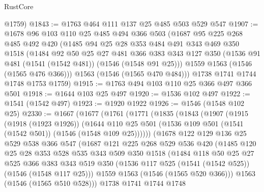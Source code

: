 \begin{lexlean}{RustCore}
\begin{coremodule}
      @1759)
@1843 := @1763 @464 @111 @137 @25 @485 @503 @529 @547
@1907 := @1678
    @96
    @103
    @110
    @25
    @485
    @494
    @366
    @503
    (@1687
      @95
      @225
      @268
      @485
      @492
      @420
      (@1485
        @94
        @25
        @28
        @353
        @484
        @491
        @343
        @469
        @350
        @1518
        (@1484
          @92
          @50
          @25
          @27
          @481
          @366
          @383
          @343
          @127
          @350
          (@1536 @91 @481 (@1541 (@1542 @481)) (@1546 (@1548 @91 @25)))
          @1559
          @1563
          (@1546 (@1565 @476 @366)))
        @1563
        (@1546 (@1565 @470 @484)))
      @1738
      @1741
      @1744
      @1748
      @1753
      @1759)
@1915 := @1763 @494 @103 @110 @25 @366 @497 @366 @501
@1918 := @1644 @103 @25 @497
@1920 := @1536 @102 @497
@1922 := @1541 (@1542 @497)
@1923 := @1920 @1922
@1926 := @1546 (@1548 @102 @25)
@2330 := @1667
    (@1677
      (@1761
        (@1771
          (@1835
            (@1843
              (@1907
                (@1915
                  (@1918 (@1923 @1926))
                  (@1644
                    @110
                    @25
                    @501
                    (@1536 @109 @501 (@1541 (@1542 @501)) (@1546 (@1548 @109 @25))))))
              (@1678
                @122
                @129
                @136
                @25
                @529
                @538
                @366
                @547
                (@1687
                  @121
                  @225
                  @268
                  @529
                  @536
                  @420
                  (@1485
                    @120
                    @25
                    @28
                    @353
                    @528
                    @535
                    @343
                    @509
                    @350
                    @1518
                    (@1484
                      @118
                      @50
                      @25
                      @27
                      @525
                      @366
                      @383
                      @343
                      @519
                      @350
                      (@1536 @117 @525 (@1541 (@1542 @525)) (@1546 (@1548 @117 @25)))
                      @1559
                      @1563
                      (@1546 (@1565 @520 @366)))
                    @1563
                    (@1546 (@1565 @510 @528)))
                  @1738
                  @1741
                  @1744
                  @1748

\end{coremodule}
\end{lexlean}
